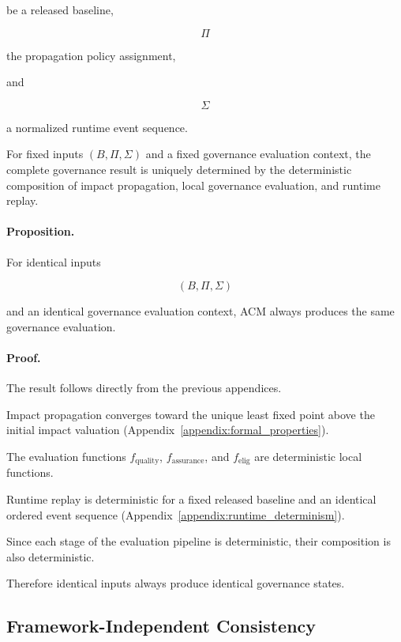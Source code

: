 \documentclass[10pt]{article}
\begin{document}
be a released baseline,

\[
\Pi
\]

the propagation policy assignment,

and

\[
\Sigma
\]

a normalized runtime event sequence.

For fixed inputs $(B,\Pi,\Sigma)$ and a fixed governance evaluation context, the
complete governance result is uniquely determined by the deterministic
composition of impact propagation, local governance evaluation, and runtime
replay.

\paragraph*{Proposition.}

For identical inputs

\[
(B,\Pi,\Sigma)
\]

and an identical governance evaluation context, ACM always produces the same
governance evaluation.

\paragraph*{Proof.}

The result follows directly from the previous appendices.

Impact propagation converges toward the unique least fixed point above the initial impact valuation (Appendix~\ref{appendix:formal_properties}).

The evaluation functions
$f_{\mathrm{quality}}$,
$f_{\mathrm{assurance}}$,
and
$f_{\mathrm{elig}}$
are deterministic local functions.

Runtime replay is deterministic for a fixed released baseline and an identical ordered event sequence (Appendix~\ref{appendix:runtime_determinism}).

Since each stage of the evaluation pipeline is deterministic, their composition is also deterministic.

Therefore identical inputs always produce identical governance states.


\subsection{Framework-Independent Consistency}
\label{appendix:framework_independent_consistency}
\end{document}
